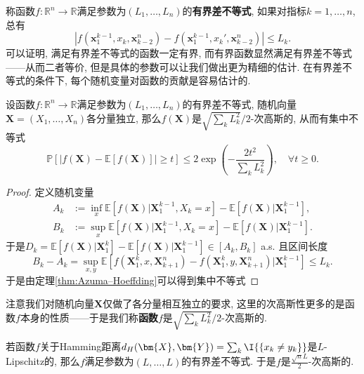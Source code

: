 称函数$f \colon \mathbb{R}^n \to \mathbb{R}$满足参数为$(L_1, \dots, L_n)$的\textbf{有界差不等式}, 如果对指标$k = 1, \dots, n$, 总有
\begin{equation*}
	|f(\bm{x}_1^{k-1}, x_k, \bm{x}_{k-2}^n) - f(\bm{x}_1^{k-1}, x_k', \bm{x}_{k-2}^n)| 
	\leq L_k. 
\end{equation*} 
可以证明, 满足有界差不等式的函数一定有界, 而有界函数显然满足有界差不等式——从而二者等价, 但是具体的参数可以让我们做出更为精细的估计.  
在有界差不等式的条件下, 每个随机变量对函数的贡献是容易估计的.
\begin{corollary}[有界差不等式]\label{cor:BddDiffIneq}
	设函数$f \colon \mathbb{R}^n \to \mathbb{R}$满足参数为$(L_1, \dots, L_n)$的有界差不等式, 随机向量$\bm{X} = (X_1, \dots, X_n)$各分量独立, 那么$f(\bm{X})$是$\sqrt{\sum_k L_k^2} / 2$-次高斯的, 从而有集中不等式
	\begin{equation}
		\mathbb{P}[|f(\bm{X}) - \mathbb{E}[f(\bm{X})]| \geq t] 
		\leq 2 \exp\left( - \frac{2 t^2}{\sum_k L_k^2} \right), 
		\quad \forall t \geq 0. 
	\end{equation}
\end{corollary}
\begin{proof}
	定义随机变量 
	\begin{align*}
		A_k &:= \inf_x \mathbb{E}[f(\bm{X})|\bm{X}_1^{k-1}, X_k = x] - \mathbb{E}[f(\bm{X})|\bm{X}_1^{k-1}], \\
		B_k &:= \sup_x \mathbb{E}[f(\bm{X})|\bm{X}_1^{k-1}, X_k = x] - \mathbb{E}[f(\bm{X})|\bm{X}_1^{k-1}]. 
	\end{align*} 
	于是$D_k = \mathbb{E}[f(\bm{X})|\bm{X}_1^{k}] - \mathbb{E}[f(\bm{X})|\bm{X}_1^{k-1}] \in [A_k, B_k]$ a.s. 且区间长度
	\begin{equation*}
		B_k - A_k
		= \sup_{x, y} \mathbb{E}[f(\bm{X}_1^k, x, \bm{X}_{k+1}^n) - f(\bm{X}_1^k, y, \bm{X}_{k+1}^n) | \bm{X}_1^{k-1}] 
		\leq L_k. 
	\end{equation*}
	于是由定理\ref{thm:Azuma–Hoeffding}可以得到集中不等式
\end{proof}

\begin{remark}[次高斯函数]
	注意我们对随机向量$\bm X$仅做了各分量相互独立的要求, 这里的次高斯性更多的是函数$f$本身的性质——于是我们称\textbf{函数}$f$是$\sqrt{\sum_k L_k^2} / 2$-次高斯的. 
\end{remark}

\begin{example}
	若函数$f$关于Hamming距离$d_H(\bm{X}, \bm{Y}) = \sum_k \I{\{x_k \neq y_k\}}$是$L$-Lipschitz的, 那么$f$满足参数为$(L, \dots, L)$的有界差不等式. 
	于是$f$是$\frac{\sqrt{n} L}{2}$-次高斯的. 
\end{example}

